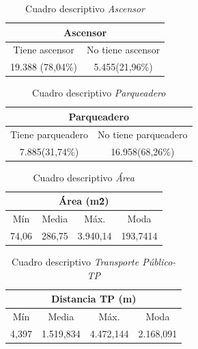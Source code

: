 \documentclass[conference, 10pt]{IEEEtran}
\begin{document}
\begin{table}[htbp]
\caption{Cuadro descriptivo \textit{Ascensor}}
\begin{center}
\begin{tabular}{|c|c|}
\hline
\multicolumn{2}{|c|}{\textbf{Ascensor}} \\
\cline{1-2} 
\hline
 Tiene ascensor&No tiene ascensor\\
 19.388 (78,04\%)&5.455(21,96\%)\\
  
	\hline
\end{tabular}
\label{tab_5}
\end{center}
\end{table}

\begin{table}[htbp]
\caption{Cuadro descriptivo \textit{Parqueadero}}
\begin{center}
\begin{tabular}{|c|c|}
\hline
\multicolumn{2}{|c|}{\textbf{Parqueadero}} \\
\cline{1-2} 
\hline
 Tiene parqueadero&No tiene parqueadero\\
 7.885(31,74\%)&16.958(68,26\%)\\
  
	\hline
\end{tabular}
\label{tab_6}
\end{center}
\end{table}

\begin{table}[htbp]
\caption{Cuadro descriptivo \textit{Área}}
\begin{center}
\begin{tabular}{|c|c|c|c|}
\hline
\multicolumn{4}{|c|}{\textbf{Área (m\^{2})}} \\
\cline{1-4} 
\hline
 Mín&Media&Máx.&Moda\\
\hline
 74,06&286,75&3.940,14&193,7414\\
 	\hline
\end{tabular}
\label{tab_7}
\end{center}
\end{table}


\begin{table}[htbp]
\caption{Cuadro descriptivo \textit{Transporte Público-TP}}
\begin{center}
\begin{tabular}{|c|c|c|c|}
\hline
\multicolumn{4}{|c|}{\textbf{Distancia TP (m)}} \\
\cline{1-4} 
\hline
 Mín&Media&Máx.&Moda\\
\hline
 4,397&1.519,834&4.472,144&2.168,091\\
 	\hline
\end{tabular}
\label{tab_8}
\end{center}
\end{table}
\end{document}
